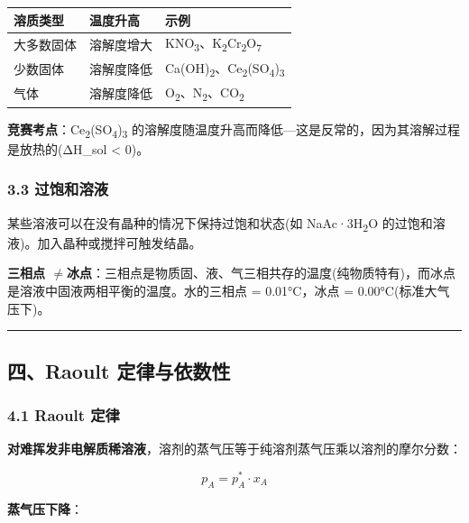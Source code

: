 \documentclass[a4paper,11pt]{ctexart}
\newcounter{none}
\newcommand{\箭}{\ensuremath{\rightarrow}}
\newcommand{\左箭}{\ensuremath{\leftarrow}}
\newcommand{\上箭}{\ensuremath{\uparrow}}
\newcommand{\下箭}{\ensuremath{\downarrow}}
\newcommand{\衡}{\ensuremath{\rightleftharpoons}}
\newcommand{\双箭}{\ensuremath{\leftrightarrow}}
\newcommand{\约等于}{\ensuremath{\approx}}
\newcommand{\小于等于}{\ensuremath{\leq}}
\newcommand{\大于等于}{\ensuremath{\geq}}
\newcommand{\不等于}{\ensuremath{\neq}}
\newcommand{\西格马}{\ensuremath{\sigma}}
\newcommand{\派}{\ensuremath{\pi}}
\begin{document}
{\def\LTcaptype{none} %
\begin{longtable}[]{@{}lll@{}}
\toprule\noalign{}
溶质类型 & 温度升高 & 示例 \\
\midrule\noalign{}
\endhead
\bottomrule\noalign{}
\endlastfoot
大多数固体 & 溶解度增大 & KNO\textsubscript{3}、K\textsubscript{2}Cr\textsubscript{2}O\textsubscript{7} \\
少数固体 & 溶解度降低 & Ca(OH)\textsubscript{2}、Ce\textsubscript{2}(SO\textsubscript{4})\textsubscript{3} \\
气体 & 溶解度降低 & O\textsubscript{2}、N\textsubscript{2}、CO\textsubscript{2} \\
\end{longtable}
}

\textbf{竞赛考点}：Ce\textsubscript{2}(SO\textsubscript{4})\textsubscript{3} 的溶解度随温度升高而降低---这是反常的，因为其溶解过程是放热的(ΔH\_sol \textless{} 0)。

\subsubsection{3.3 过饱和溶液}\label{ux8fc7ux9971ux548cux6eb6ux6db2}

某些溶液可以在没有晶种的情况下保持过饱和状态(如 NaAc·3H\textsubscript{2}O 的过饱和溶液)。加入晶种或搅拌可触发结晶。

\textbf{三相点 \不等于 冰点}：三相点是物质固、液、气三相共存的温度(纯物质特有)，而冰点是溶液中固液两相平衡的温度。水的三相点 = 0.01°C，冰点 = 0.00°C(标准大气压下)。

\begin{center}\rule{0.5\linewidth}{0.5pt}\end{center}

\subsection{四、Raoult 定律与依数性}\label{ux56dbraoult-ux5b9aux5f8bux4e0eux4f9dux6570ux6027}

\subsubsection{4.1 Raoult 定律}\label{raoult-ux5b9aux5f8b}

\textbf{对难挥发非电解质稀溶液}，溶剂的蒸气压等于纯溶剂蒸气压乘以溶剂的摩尔分数：

\[
\boxed{p_A = p_A^* \cdot x_A}
\]

\textbf{蒸气压下降}：
\end{document}
